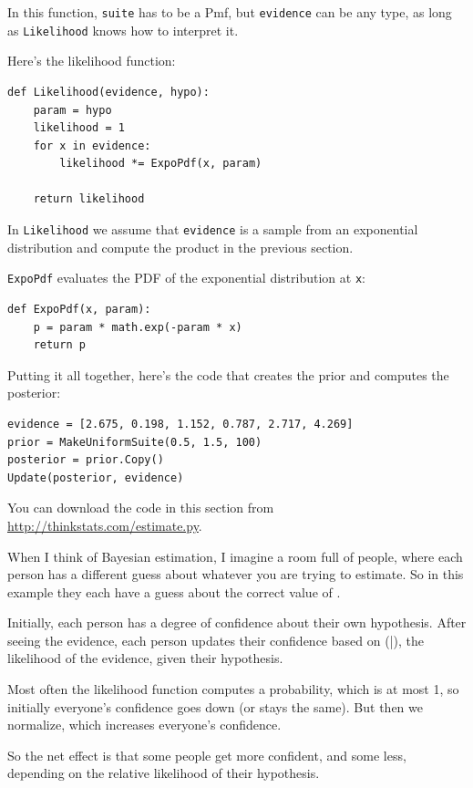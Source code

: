 \documentclass[12pt]{book}
\begin{document}
In this function, {\tt suite} has to be a Pmf, but {\tt evidence}
can be any type, as long as {\tt Likelihood} knows how to interpret it.

Here's the likelihood function:
%
\begin{verbatim}
def Likelihood(evidence, hypo):
    param = hypo
    likelihood = 1
    for x in evidence:
        likelihood *= ExpoPdf(x, param)

    return likelihood
\end{verbatim}

In {\tt Likelihood} we assume that {\tt evidence} is a sample
from an exponential distribution and compute the product in the
previous section.

{\tt ExpoPdf} evaluates the PDF of the exponential distribution
at {\tt x}:
%
\begin{verbatim}
def ExpoPdf(x, param):
    p = param * math.exp(-param * x)
    return p
\end{verbatim}

Putting it all together, here's the code that creates the prior
and computes the posterior:
%
\begin{verbatim}
evidence = [2.675, 0.198, 1.152, 0.787, 2.717, 4.269]
prior = MakeUniformSuite(0.5, 1.5, 100)
posterior = prior.Copy()
Update(posterior, evidence)
\end{verbatim}

You can download the code in this section from
\url{http://thinkstats.com/estimate.py}.

When I think of Bayesian estimation, I imagine a room full of people,
where each person has a different guess about whatever you are trying
to estimate.  So in this example they each have a guess about the
correct value of \mylambda.

Initially, each person has a degree of confidence about their own hypothesis.
After seeing the evidence, each person updates their confidence based on
\Prob(\E|\HH), the likelihood of the evidence, given their hypothesis.

Most often the likelihood function computes a
probability, which is at most 1, so initially everyone's confidence
goes down (or stays the same).  But then we normalize, which increases
everyone's confidence.

So the net effect is that some people get more confident, and some less,
depending on the relative likelihood of their hypothesis.
\end{document}
